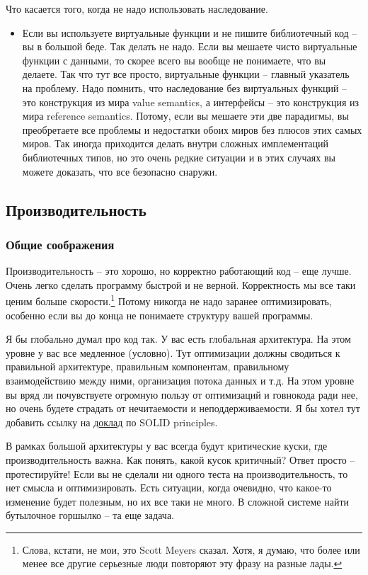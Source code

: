 \documentclass{article}
\begin{document}
Что касается того, когда не надо использовать наследование.
\begin{itemize}
\item Если вы используете виртуальные функции и не пишите библиотечный код -- вы в большой беде. Так делать не надо. Если вы мешаете чисто виртуальные функции с данными, то скорее всего вы вообще не понимаете, что вы делаете. Так что тут все просто, виртуальные функции -- главный указатель на проблему. Надо помнить, что наследование без виртуальных функций -- это конструкция из мира value semantics, а интерфейсы -- это конструкция из мира reference semantics. Потому, если вы мешаете эти две парадигмы, вы преобретаете все проблемы и недостатки обоих миров без плюсов этих самых миров. Так иногда приходится делать внутри сложных имплементаций библиотечных типов, но это очень редкие ситуации и в этих случаях вы можете доказать, что все безопасно снаружи.
\end{itemize}

\subsection{Производительность}

\subsubsection{Общие соображения}

Производительность -- это хорошо, но корректно работающий код -- еще лучше. Очень легко сделать программу быстрой и не верной. Корректность мы все таки ценим больше скорости.\footnote{Слова, кстати, не мои, это Scott Meyers сказал. Хотя, я думаю, что более или менее все другие серьезные люди повторяют эту фразу на разные лады.} Потому никогда не надо заранее оптимизировать, особенно если вы до конца не понимаете структуру вашей программы.

Я бы глобально думал про код так. У вас есть глобальная архитектура. На этом уровне у вас все медленное (условно). Тут оптимизации должны сводиться к правильной архитектуре, правильным компонентам, правильному взаимодействию между ними, организация потока данных и т.д. На этом уровне вы вряд ли почувствуете огромную пользу от оптимизаций и говнокода ради нее, но очень будете страдать от нечитаемости и неподдерживаемости. Я бы хотел тут добавить ссылку на \href{https://www.youtube.com/watch?v=Ntraj80qN2k}{доклад} по SOLID principles.

В рамках большой архитектуры у вас всегда будут критические куски, где производительность важна. Как понять, какой кусок критичный? Ответ просто -- протестируйте! Если вы не сделали ни одного теста на производительность, то нет смысла и оптимизировать. Есть ситуации, когда очевидно, что какое-то изменение будет полезным, но их все таки не много. В сложной системе найти бутылочное горшылко -- та еще задача.
\end{document}

